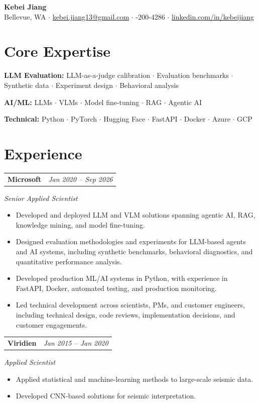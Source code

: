 \documentclass[10pt,letterpaper]{article}
\makeatletter
\newcommand{\experienceHeading}[2]{%
    \vspace{2pt}
    \begin{tabularx}{\textwidth}{@{}Xr@{}}
        \textbf{#1} & \textit{#2}
    \end{tabularx}
}
\makeatother
\begin{document}
\begin{center}
{\LARGE \textbf{Kebei Jiang}}\\[3pt]
Bellevue, WA \quad $\cdot$ \quad
\href{mailto:YOUR_EMAIL}{kebei.jiang13@gmail.com} \quad $\cdot$ -200-4286 \quad $\cdot$ \quad
\href{https://www.linkedin.com/in/kebeijiang}{linkedin.com/in/kebeijiang}
\end{center}

\vspace{-3pt}

\section*{Core Expertise}
\textbf{LLM Evaluation:} LLM-as-a-judge calibration $\cdot$ Evaluation benchmarks $\cdot$ Synthetic data $\cdot$ Experiment design $\cdot$ Behavioral analysis

\textbf{AI/ML:} LLMs $\cdot$ VLMs $\cdot$ Model fine-tuning $\cdot$ RAG $\cdot$ Agentic AI

\textbf{Technical:} Python $\cdot$ PyTorch $\cdot$ Hugging Face $\cdot$ FastAPI $\cdot$ Docker $\cdot$ Azure $\cdot$ GCP

\section*{Experience}

\experienceHeading{Microsoft}{Jan 2020 -- Sep 2026}
\textit{Senior Applied Scientist}
\begin{itemize}
\item Developed and deployed LLM and VLM solutions spanning agentic AI, RAG, knowledge mining, and model fine-tuning.
\item Designed evaluation methodologies and experiments for LLM-based agents and AI systems, including synthetic benchmarks, behavioral diagnostics, and quantitative performance analysis.
\item Developed production ML/AI systems in Python, with experience in FastAPI, Docker, automated testing, and production monitoring.
\item Led technical development across scientists, PMs, and customer engineers, including technical design, code reviews, implementation decisions, and customer engagements.
\end{itemize}

\experienceHeading{Viridien}{Jan 2015 -- Jan 2020}
\textit{Applied Scientist}
\begin{itemize}
\item Applied statistical and machine-learning methods to large-scale seismic data.
\item Developed CNN-based solutions for seismic interpretation.
\end{itemize}
\end{document}
